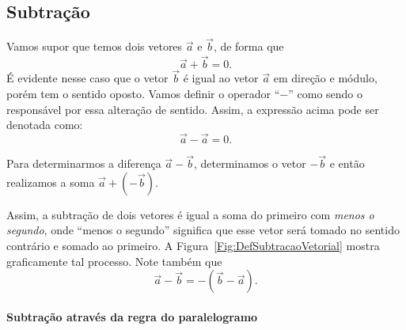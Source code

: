 \subsection{Subtração}

Vamos supor que temos dois vetores $\vec{a}$ e $\vec{b}$, de forma que
\begin{equation}
    \vec{a} + \vec{b} = 0.
\end{equation}
%
É evidente nesse caso que o vetor $\vec{b}$ é igual ao vetor $\vec{a}$ em direção e módulo, porém tem o sentido oposto. Vamos definir o operador ``$-$'' como sendo o responsável por essa alteração de sentido. Assim, a expressão acima pode ser denotada como:
\begin{equation}
    \vec{a} - \vec{a} = 0.
\end{equation}

\begin{marginfigure}[-1cm]
\centering
{}
\caption{Para determinarmos a diferença $\vec{a} - \vec{b}$, determinamos o vetor $-\vec{b}$ e então realizamos a soma $\vec{a} + (-\vec{b})$.\label{Fig:DefSubtracaoVetorial}}
\end{marginfigure}

Assim, a subtração de dois vetores é igual a soma do primeiro com \emph{menos o segundo}, onde ``menos o segundo'' significa que esse vetor será tomado no sentido contrário e somado ao primeiro. A Figura~\ref{Fig:DefSubtracaoVetorial} mostra graficamente tal processo. Note também que
\begin{equation}
    \vec{a} - \vec{b} = -(\vec{b}-\vec{a}).
\end{equation}

\paragraph{Subtração através da regra do paralelogramo}

